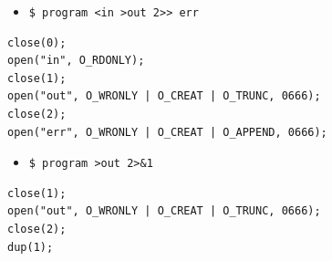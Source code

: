 
\begin{slide}
\begin{itemize}
\item \verb#$ program <in >out 2>> err#
\end{itemize}
\begin{verbatim}
close(0);
open("in", O_RDONLY);
close(1);
open("out", O_WRONLY | O_CREAT | O_TRUNC, 0666);
close(2);
open("err", O_WRONLY | O_CREAT | O_APPEND, 0666);
\end{verbatim}
\begin{itemize}
\item \verb#$ program >out 2>&1#
\end{itemize}
\begin{verbatim}
close(1);
open("out", O_WRONLY | O_CREAT | O_TRUNC, 0666);
close(2);
dup(1);
\end{verbatim}
\end{slide}

